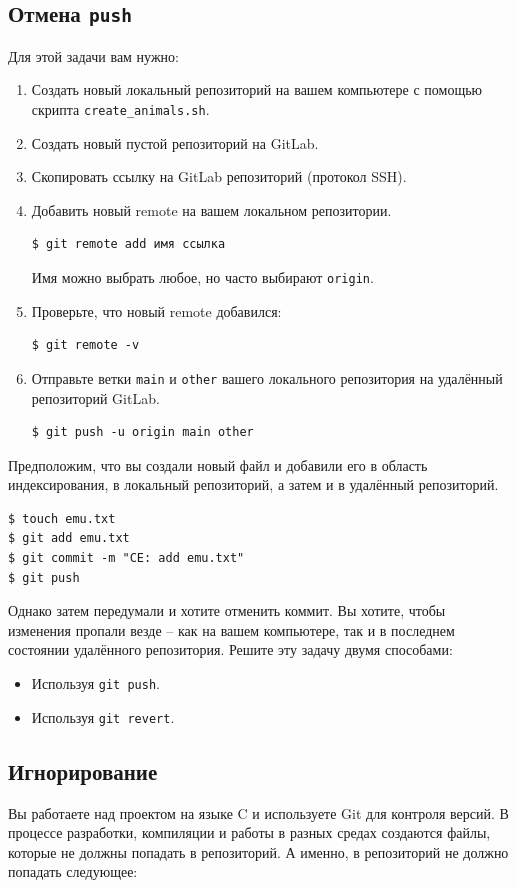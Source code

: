 \documentclass{article}
\begin{document}
\subsection{Отмена \texttt{push}}
Для этой задачи вам нужно:
\begin{enumerate}
\item Создать новый локальный репозиторий на вашем компьютере с помощью скрипта \texttt{create\_animals.sh}.
\item Создать новый пустой репозиторий на GitLab.
\item Скопировать ссылку на GitLab репозиторий (протокол SSH).
\item Добавить новый remote на вашем локальном репозитории. 
\begin{lstlisting}[style=csMiptBash]
$ git remote add имя ссылка
\end{lstlisting}
Имя можно выбрать любое, но часто выбирают \texttt{origin}.
\item Проверьте, что новый remote добавился:
\begin{lstlisting}[style=csMiptBash]
$ git remote -v
\end{lstlisting}
\item Отправьте ветки \texttt{main} и \texttt{other} вашего локального репозитория на удалённый репозиторий GitLab.
\begin{lstlisting}[style=csMiptBash]
$ git push -u origin main other
\end{lstlisting}
\end{enumerate}

\noindent Предположим, что вы создали новый файл и добавили его в область индексирования, в локальный репозиторий, а затем и в удалённый репозиторий.
\begin{lstlisting}[style=csMiptBash]
$ touch emu.txt
$ git add emu.txt
$ git commit -m "CE: add emu.txt"
$ git push
\end{lstlisting}
Однако затем передумали и хотите отменить коммит. Вы хотите, чтобы изменения пропали везде -- как на вашем компьютере, так и в последнем состоянии удалённого репозитория. Решите эту задачу двумя способами:
\begin{itemize}
\item Используя \texttt{git push}.
\item Используя \texttt{git revert}.
\end{itemize}



\subsection{Игнорирование}
Вы работаете над проектом на языке C и используете Git для контроля версий. В процессе разработки, компиляции и работы в разных средах создаются файлы, которые не должны попадать в репозиторий. А именно, в репозиторий не должно попадать следующее:
\end{document}
